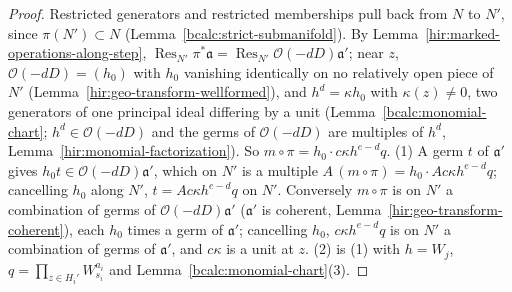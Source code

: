 \begin{proof}
\mixedleanok
Restricted generators and restricted memberships pull back from \(N\) to \(N'\), since \(\pi(N')\subset N\) (Lemma~\ref{bcalc:strict-submanifold}). By
Lemma~\ref{hir:marked-operations-along-step}, \(\operatorname{Res}_{N'}\pi^*\mathfrak a=\operatorname{Res}_{N'}\mathcal O(-dD)\mathfrak a'\); near \(z\), \(\mathcal O(-dD)=(h_0)\) with
\(h_0\) vanishing identically on no relatively open piece of \(N'\) (Lemma~\ref{hir:geo-transform-wellformed}), and \(h^d=\kappa h_0\) with \(\kappa(z)\ne0\), two
generators of one principal ideal differing by a unit (Lemma~\ref{bcalc:monomial-chart}; \(h^d\in\mathcal O(-dD)\) and the germs of \(\mathcal O(-dD)\) are multiples of
\(h^d\), Lemma~\ref{hir:monomial-factorization}). So \(m\circ\pi=h_0\cdot c\kappa h^{e-d}q\). (1) A germ \(t\) of \(\mathfrak a'\) gives \(h_0t\in\mathcal O(-dD)\mathfrak a'\), which on
\(N'\) is a multiple \(A\,(m\circ\pi)=h_0\cdot Ac\kappa h^{e-d}q\); cancelling \(h_0\) along \(N'\), \(t=Ac\kappa h^{e-d}q\) on \(N'\). Conversely \(m\circ\pi\) is on \(N'\) a
combination of germs of \(\mathcal O(-dD)\mathfrak a'\) (\(\mathfrak a'\) is coherent, Lemma~\ref{hir:geo-transform-coherent}), each \(h_0\) times a germ of \(\mathfrak a'\);
cancelling \(h_0\), \(c\kappa h^{e-d}q\) is on \(N'\) a combination of germs of \(\mathfrak a'\), and \(c\kappa\) is a unit at \(z\). (2) is (1) with \(h=W_j\),
\(q=\prod_{z\in H_i'}W_{s_i}^{a_i}\) and Lemma~\ref{bcalc:monomial-chart}(3).
\end{proof}

